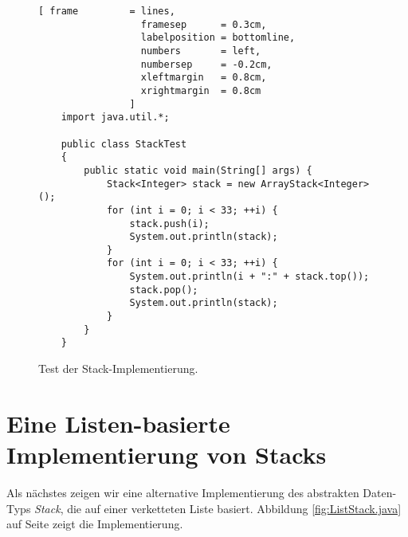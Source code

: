 \begin{figure}[!h]
  \centering
\begin{Verbatim}[ frame         = lines, 
                  framesep      = 0.3cm, 
                  labelposition = bottomline,
                  numbers       = left,
                  numbersep     = -0.2cm,
                  xleftmargin   = 0.8cm,
                  xrightmargin  = 0.8cm
                ]
    import java.util.*;
    
    public class StackTest 
    {
        public static void main(String[] args) {
            Stack<Integer> stack = new ArrayStack<Integer>();
            for (int i = 0; i < 33; ++i) {
                stack.push(i);
                System.out.println(stack);
            }
            for (int i = 0; i < 33; ++i) {
                System.out.println(i + ":" + stack.top());
                stack.pop();
                System.out.println(stack);
            }
        }
    }
\end{Verbatim}
\vspace*{-0.3cm}
  \caption{Test der Stack-Implementierung.}
  \label{fig:StackTest.java}
\end{figure} 

\section{Eine Listen-basierte Implementierung von Stacks}
Als n\"achstes zeigen wir eine alternative Implementierung des abstrakten Daten-Typs
\textsl{Stack}, die auf einer verketteten Liste basiert.
Abbildung \ref{fig:ListStack.java} auf Seite \pageref{fig:ListStack.java} zeigt die
Implementierung.

